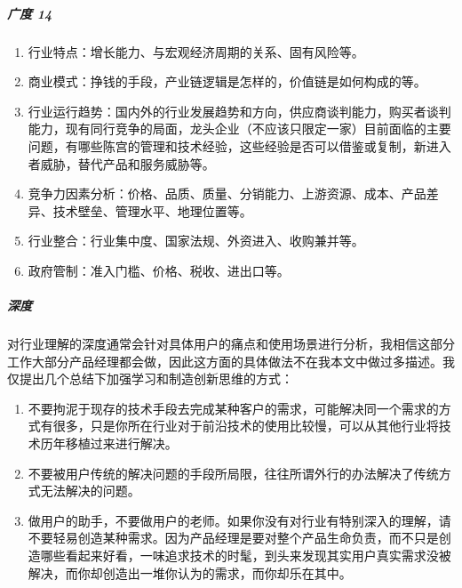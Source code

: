\documentclass[letterpaper,11pt,english]{sphinxmanual}
\begin{document}
\subparagraph{广度 14\sphinxfootnotemark[441]}
\label{\detokenize{chapter_knowledge/industry_analysis:id24}}%
\begin{footnotetext}[441]\sphinxAtStartFootnote
{}
%
\end{footnotetext}\ignorespaces \begin{enumerate}
%
\item {} 
行业特点：增长能力、与宏观经济周期的关系、固有风险等。

\item {} 
商业模式：挣钱的手段，产业链逻辑是怎样的，价值链是如何构成的等。

\item {} 
行业运行趋势：国内外的行业发展趋势和方向，供应商谈判能力，购买者谈判能力，现有同行竞争的局面，龙头企业（不应该只限定一家）目前面临的主要问题，有哪些陈宫的管理和技术经验，这些经验是否可以借鉴或复制，新进入者威胁，替代产品和服务威胁等。

\item {} 
竞争力因素分析：价格、品质、质量、分销能力、上游资源、成本、产品差异、技术壁垒、管理水平、地理位置等。

\item {} 
行业整合：行业集中度、国家法规、外资进入、收购兼并等。

\item {} 
政府管制：准入门槛、价格、税收、进出口等。

\end{enumerate}


\subparagraph{深度}
\label{\detokenize{chapter_knowledge/industry_analysis:id25}}
对行业理解的深度通常会针对具体用户的痛点和使用场景进行分析，我相信这部分工作大部分产品经理都会做，因此这方面的具体做法不在我本文中做过多描述。我仅提出几个总结下加强学习和制造创新思维的方式：
\begin{enumerate}
%
\item {} 
不要拘泥于现存的技术手段去完成某种客户的需求，可能解决同一个需求的方式有很多，只是你所在行业对于前沿技术的使用比较慢，可以从其他行业将技术历年移植过来进行解决。

\item {} 
不要被用户传统的解决问题的手段所局限，往往所谓外行的办法解决了传统方式无法解决的问题。

\item {} 
做用户的助手，不要做用户的老师。如果你没有对行业有特别深入的理解，请不要轻易创造某种需求。因为产品经理是要对整个产品生命负责，而不只是创造哪些看起来好看，一味追求技术的时髦，到头来发现其实用户真实需求没被解决，而你却创造出一堆你认为的需求，而你却乐在其中。

\end{enumerate}
\end{document}
